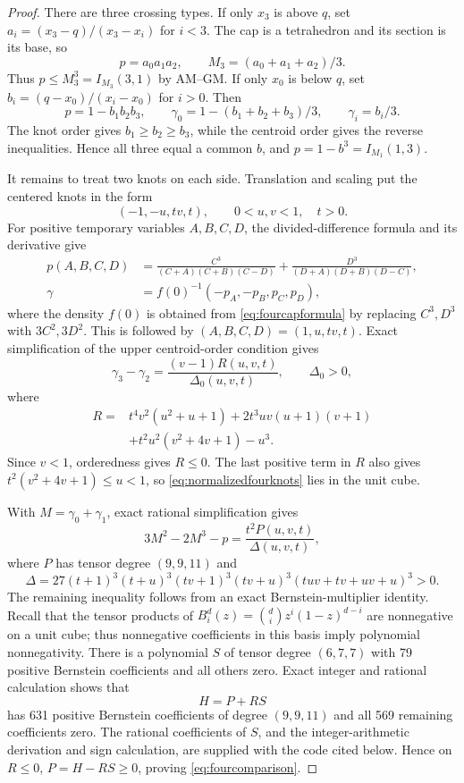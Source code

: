 \documentclass[11pt]{article}
\theoremstyle{definition}
\begin{document}
\begin{proof}
There are three crossing types.  If only $x_3$ is above $q$, set
$a_i=(x_3-q)/(x_3-x_i)$ for $i<3$.  The cap is a tetrahedron and its section
is its base, so
\[
 p=a_0a_1a_2,\qquad M_3=(a_0+a_1+a_2)/3.
\]
Thus $p\le M_3^3=I_{M_3}(3,1)$ by AM--GM.  If only $x_0$ is below $q$, set
$b_i=(q-x_0)/(x_i-x_0)$ for $i>0$.  Then
\[
 p=1-b_1b_2b_3,\qquad
 \gamma_0=1-(b_1+b_2+b_3)/3,\qquad \gamma_i=b_i/3.
\]
The knot order gives $b_1\ge b_2\ge b_3$, while the centroid order gives the
reverse inequalities.  Hence all three equal a common $b$, and
$p=1-b^3=I_{M_1}(1,3)$.

It remains to treat two knots on each side.  Translation and scaling put the
centered knots in the form
\begin{equation}\label{eq:normalizedfourknots}
 (-1,-u,tv,t),\qquad 0<u,v<1,\quad t>0.
\end{equation}
For positive temporary variables $A,B,C,D$, the divided-difference formula \cite{carlson1991,lasserre2015}
and its derivative give
\begin{align}
 p(A,B,C,D)&=
 \frac{C^3}{(C+A)(C+B)(C-D)}
 +\frac{D^3}{(D+A)(D+B)(D-C)},\label{eq:fourcapformula}\\
 \gamma&=f(0)^{-1}(-p_A,-p_B,p_C,p_D),
\end{align}
where the density $f(0)$ is obtained from \eqref{eq:fourcapformula} by
replacing $C^3,D^3$ with $3C^2,3D^2$.  This is followed by
$(A,B,C,D)=(1,u,tv,t)$.  Exact simplification of the upper
centroid-order condition gives
\begin{equation}\label{eq:orderfactor}
 \gamma_3-\gamma_2=\frac{(v-1)R(u,v,t)}{\Delta_0(u,v,t)},
 \qquad \Delta_0>0,
\end{equation}
where
\begin{align*}
 R={}&t^4v^2(u^2+u+1)+2t^3uv(u+1)(v+1)\\
    &+t^2u^2(v^2+4v+1)-u^3.
\end{align*}
Since $v<1$, orderedness gives $R\le0$.  The last positive term in $R$
also gives $t^2(v^2+4v+1)\le u<1$, so \eqref{eq:normalizedfourknots} lies
in the unit cube.

With $M=\gamma_0+\gamma_1$, exact rational simplification gives
\begin{equation}\label{eq:fourcomparison}
 3M^2-2M^3-p=\frac{t^2P(u,v,t)}{\Delta(u,v,t)},
\end{equation}
where $P$ has tensor degree $(9,9,11)$ and
\[
 \Delta=27(t+1)^3(t+u)^3(tv+1)^3(tv+u)^3
 (tuv+tv+uv+u)^3>0.
\]
The remaining inequality follows from an exact Bernstein-multiplier
identity. Recall that the tensor products of
$B_i^d(z)=\binom di z^i(1-z)^{d-i}$ are nonnegative on a unit cube;
thus nonnegative coefficients in this basis imply polynomial
nonnegativity.  There is a polynomial $S$ of tensor degree
$(6,7,7)$ with 79 positive Bernstein coefficients and all others zero.  Exact integer and rational calculation shows that
\[
 H=P+RS
\]
has 631 positive Bernstein coefficients of degree $(9,9,11)$ and all 569
remaining coefficients zero. The rational coefficients of $S$, and the
integer-arithmetic derivation and sign calculation, are supplied with the
code cited below. Hence on $R\le0$,
$P=H-RS\ge0$, proving \eqref{eq:fourcomparison}.


\end{proof}
\end{document}
